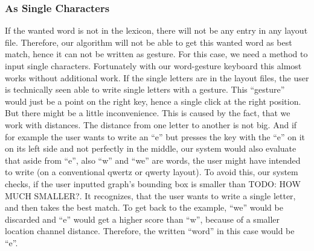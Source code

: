 \subsubsection{As Single Characters}
If the wanted word is not in the lexicon, there will not be any entry in any layout file. Therefore, our algorithm will not be able to get this wanted word as best match, hence it can not be written as gesture. For this case, we need a method to input single characters. Fortunately with our word-gesture keyboard this almost works without additional work. If the single letters are in the layout files, the user is technically seen able to write single letters with a gesture. This ``gesture'' would just be a point on the right key, hence a single click at the right position. But there might be a little inconvenience. This is caused by the fact, that we work with distances. The distance from one letter to another is not big. And if for example the user wants to write an ``e'' but presses the key with the ``e'' on it on its left side and not perfectly in the middle, our system would also evaluate that aside from ``e'', also ``w'' and ``we'' are words, the user might have intended to write (on a conventional qwertz or qwerty layout). To avoid this, our system checks, if the user inputted graph's bounding box is smaller than TODO: HOW MUCH SMALLER?. It recognizes, that the user wants to write a single letter, and then takes the best match. To get back to the example, ``we'' would be discarded and ``e'' would get a higher score than ``w'', because of a smaller location channel distance. Therefore, the written ``word'' in this case would be ``e''.

